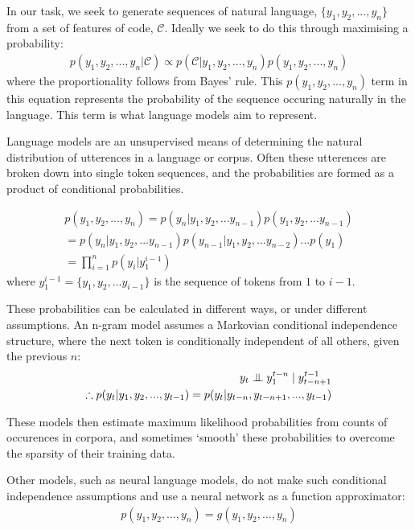 In our task, we seek to generate sequences of natural language, $\{y_1, y_2,..., y_n\}$ from a set of features of code, $\mathcal{C}$.
Ideally we seek to do this through maximising a probability:
\begin{align}
p(y_1, y_2,...,y_n | \mathcal{C}) \propto p(\mathcal{C} | y_1, y_2,...,y_n )  p(y_1, y_2,...,y_n )
\end{align}
where the proportionality follows from Bayes' rule.
This $p(y_1, y_2,...,y_n )$ term in this equation represents the probability of the sequence occuring naturally in the language. This term is what  language models aim to represent.

Language models are an unsupervised means of determining the natural distribution of utterences in a language or corpus. 
Often these utterences are broken down into single token sequences, and the probabilities are formed as a product of conditional probabilities.

\begin{align}
p(y_1, y_2,...,y_n ) = p(y_n | y_1, y_2,...y_{n-1} )  p(y_1, y_2,...y_{n-1} ) \\
= p(y_n | y_1, y_2,...y_{n-1} ) p(y_{n-1} | y_1, y_2,...y_{n-2} )...p(y_1) \nonumber\\
 = \prod_{i=1}^{n} p(y_i | y_1^{i-1} )  
\end{align}
where $y_1^{i-1} =  \{y_1, y_2,...y_{i-1}\}$ is the sequence of tokens from $1$ to $i-1$.

These probabilities can be calculated in different ways, or under different assumptions. An n-gram model assumes a Markovian conditional independence structure, where the next token is conditionally independent of all others, given the previous $n$: 
\begin{align}
 y_t \mathrel{\perp\mspace{-10mu}\perp} y_1^{t-n} \mid y^{t-1}_{t-n+1}  \\
\therefore p(y_t | y_1, y_2,..., y_{t-1} )  = p(y_t | y_{t-n}, y_{t-n+1},..., y_{t-1}  ) 
\end{align}

These models then estimate maximum likelihood probabilities from counts of occurences in corpora, and sometimes `smooth' these probabilities to overcome the sparsity of their training data. \citep{Chen:1996:ESS:981863.981904}

Other models, such as neural language models, do not make such conditional independence assumptions and use a neural network as a function approximator:
\begin{align}
p(y_1, y_2,...,y_n ) = g(y_1, y_2,...,y_n)
\end{align}


